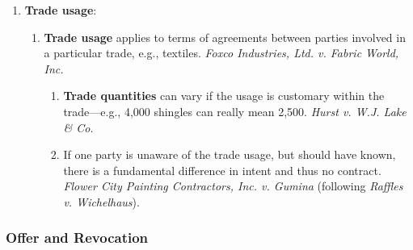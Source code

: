 \begin{enumerate}
\begin{enumerate}
        \emph{Spaulding v. Morse}. Others disagree. \emph{Lawson v. Martin 
        Timber Co.}
        \item Some amount of interpretation is always necessary---e.g., 
        ``fetch some soupmeat.''\footnote{Casebook p. 405.}
    \end{enumerate}
    \item \textbf{Trade usage}:
    \begin{enumerate}
        \item \textbf{Trade usage} applies to terms of agreements between 
        parties involved in a particular trade, e.g., textiles. \emph{Foxco 
        Industries, Ltd. v. Fabric World, Inc.}
        \begin{enumerate}
            \item \textbf{Trade quantities} can vary if the usage is customary 
            within the trade---e.g., 4,000 shingles can really mean 2,500.  
            \emph{Hurst v.  W.J. Lake \& Co.}
            \item If one party is unaware of the trade usage, but should have 
            known, there is a fundamental difference in intent and thus no 
            contract. \emph{Flower City Painting Contractors, Inc. v. Gumina} 
            (following \emph{Raffles v. Wichelhaus}).
        \end{enumerate}
    \end{enumerate}
\end{enumerate}

\subsubsection{Offer and Revocation}

